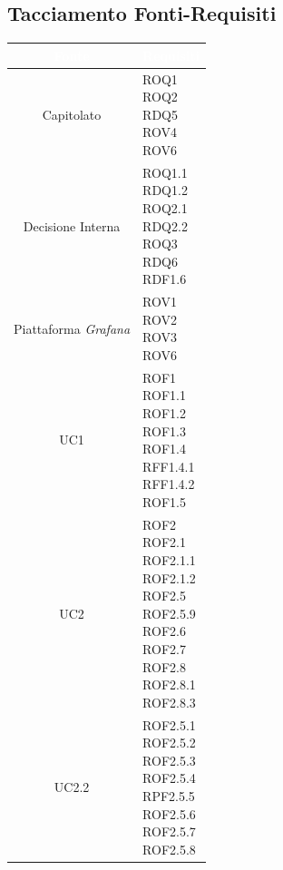 \subsection{Tacciamento Fonti-Requisiti}\label{Tracciamento}
\begin{center}
\begin{longtable}[c]{|c|m{}|}
\hline
\rowcolor{bluelogo}\textbf{\textcolor{white}{Fonte}} & \textbf{\textcolor{white}{Requisiti}}\\
\hline \hline
\endhead
Capitolato & \makecell{ROQ1\\ROQ2\\RDQ5\\ROV4\\ROV6}\\
\hline
\rowcolor{grigio}Decisione Interna & \makecell{ROQ1.1\\RDQ1.2\\ROQ2.1\\RDQ2.2\\ROQ3\\RDQ6\\RDF1.6}\\
\hline
Piattaforma \textit{Grafana} & \makecell{ROV1\\ROV2\\ROV3\\ROV6}\\
\hline
\rowcolor{grigio}UC1 & \makecell{ROF1\\ROF1.1\\ROF1.2\\ROF1.3\\ROF1.4\\RFF1.4.1\\RFF1.4.2\\ROF1.5}\\
\hline
UC2 & \makecell{ROF2\\ROF2.1\\ROF2.1.1\\ROF2.1.2\\ROF2.5\\ROF2.5.9\\ROF2.6\\ROF2.7\\ROF2.8\\ROF2.8.1\\ROF2.8.3}\\
\hline
\rowcolor{grigio}UC2.2 & \makecell{ROF2.5.1\\ROF2.5.2\\ROF2.5.3\\ROF2.5.4\\RPF2.5.5\\ROF2.5.6\\ROF2.5.7\\ROF2.5.8}\\

\end{longtable}
\end{center}
